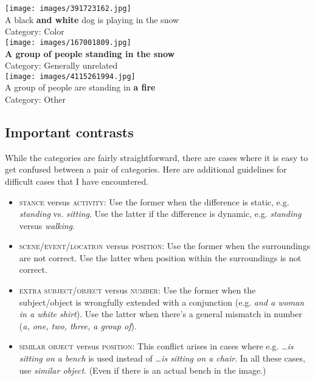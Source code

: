 \documentclass[11pt,a4paper]{article}
\begin{document}
\begin{multicols}{2}
\texttt{[image: images/391723162.jpg]}\\
A black \textbf{and white} dog is playing in the snow\\
Category: Color\\[3ex]

\texttt{[image: images/167001809.jpg]}\\
\textbf{A group of people standing in the snow}\\ 
Category: Generally unrelated\\[3ex]

\texttt{[image: images/4115261994.jpg]}\\
A group of people are standing in \textbf{a fire}\\
Category: Other

\end{multicols}


\subsection{Important contrasts}
While the categories are fairly straightforward, there are cases where it is easy to get confused between a pair of categories. Here are additional guidelines for difficult cases that I have encountered.

\begin{itemize}
\item \textsc{stance} versus \textsc{activity}: Use the former when the difference is static, e.g. \emph{standing} vs. \emph{sitting}. Use the latter if the difference is dynamic, e.g. \emph{standing} versus \emph{walking}.

\item \textsc{scene/event/location} versus \textsc{position}: Use the former when the surroundings are not correct. Use the latter when position within the surroundings is not correct.

\item \textsc{extra subject/object} versus \textsc{number}: Use the former when the subject/object is wrongfully extended with a conjunction (e.g. \emph{and a woman in a white shirt}). Use the latter when there's a general mismatch in number (\emph{a, one, two, three, a group of}).

\item \textsc{similar object} versus \textsc{position}: This conflict arises in cases where e.g. \emph{\ldots is sitting on a bench} is used instead of \emph{\ldots is sitting on a chair}. In all these cases, use \emph{similar object}. (Even if there is an actual bench in the image.)
\end{itemize}
\end{document}
